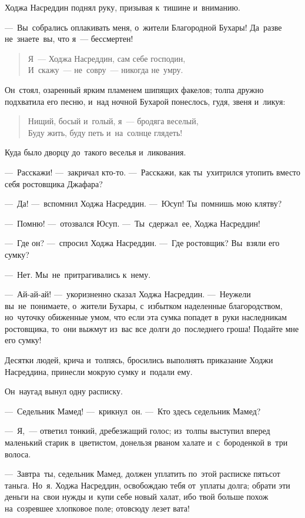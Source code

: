 \documentclass[12pt,a4paper]{book}
\begin{document}
Ходжа Насреддин поднял руку, призывая к~тишине и~вниманию.

—~Вы~собрались оплакивать меня, о~жители Благородной Бухары! Да~разве не~знаете~вы, что я~— бессмертен!

\begin{verse}
Я~— Ходжа Насреддин, сам себе господин, \\
И~скажу~— не~совру~— никогда не~умру.	
\end{verse}

Он~стоял, озаренный ярким пламенем шипящих факелов; толпа дружно подхватила его песню, и~над ночной Бухарой понеслось, гудя, звеня и~ликуя:

\begin{verse}
Нищий, босый и~голый, я~— бродяга веселый, \\
Буду жить, буду петь и~на~солнце глядеть!
\end{verse}

Куда было дворцу до~такого веселья и~ликования.

—~Расскажи! —~закричал кто-то. —~Расскажи, как ты~ухитрился утопить вместо себя ростовщика Джафара?

—~Да! —~вспомнил Ходжа Насреддин. —~Юсуп! Ты~помнишь мою клятву?

—~Помню! —~отозвался Юсуп. —~Ты~сдержал~ее, Ходжа Насреддин!

—~Где он? —~спросил Ходжа Насреддин. —~Где ростовщик? Вы~взяли его сумку?

—~Нет. Мы~не~притрагивались к~нему.

—~Ай-ай-ай! —~укоризненно сказал Ходжа Насреддин. —~Неужели вы~не~понимаете, о~жители Бухары, с~избытком наделенные благородством, но~чуточку обиженные умом, что если эта сумка попадет в~руки наследникам ростовщика, то~они выжмут из~вас все долги до~последнего гроша! Подайте мне его сумку!

Десятки людей, крича и~толпясь, бросились выполнять приказание Ходжи Насреддина, принесли мокрую сумку и~подали ему.

Он~наугад вынул одну расписку.

—~Седельник Мамед! —~крикнул~он. —~Кто здесь седельник Мамед?

—~Я,~— ответил тонкий, дребезжащий голос; из~толпы выступил вперед маленький старик в~цветистом, донельзя рваном халате и~с~бороденкой в~три волоса.

—~Завтра~ты, седельник Мамед, должен уплатить по~этой расписке пятьсот таньга. Но~я. Ходжа Насреддин, освобождаю тебя от~уплаты долга; обрати эти деньги на~свои нужды и~купи себе новый халат, ибо твой больше похож на~созревшее хлопковое поле; отовсюду лезет вата!
\end{document}
